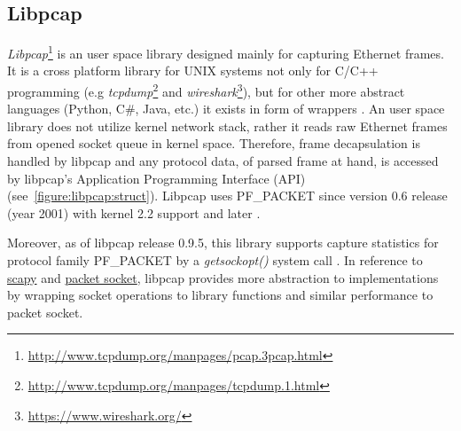 \documentclass[12pt,a4paper,twoside]{report}
\begin{document}
		\subsection{Libpcap} \label{analysis:mechs:libpcap}
			\emph{Libpcap}\footnote{\url{http://www.tcpdump.org/manpages/pcap.3pcap.html}} is an user space library designed mainly for capturing Ethernet frames. It is a cross platform library for UNIX systems not only for C/C++ programming (e.g \emph{tcpdump}\footnote{\url{http://www.tcpdump.org/manpages/tcpdump.1.html}} and \emph{wireshark}\footnote{\url{https://www.wireshark.org/}}), but for other more abstract languages (Python, C\#, Java, etc.) it exists in form of wrappers \cite{article:libpcap}. An user space library does not utilize kernel network stack, rather it reads raw Ethernet frames from opened socket queue in kernel space. Therefore, frame decapsulation is handled by libpcap and any protocol data, of parsed frame at hand, is accessed by libpcap's Application Programming Interface (API) (see~\autoref{figure:libpcap:struct}). Libpcap uses PF\_PACKET \cite{presentation:socket} \cite{report:libpcap} since version 0.6 release (year 2001) with kernel 2.2 support and later \cite{git:libpcap0.6:changes}.\par
			Moreover, as of libpcap release 0.9.5, this library supports capture statistics for protocol family PF\_PACKET by a \emph{getsockopt()} system call \cite{git:libpcap0.9:changes}. In reference to \hyperref[analysis:mechs:scapy_rss]{scapy} and \hyperref[analysis:mechs:socket]{packet socket}, libpcap provides more abstraction to implementations by wrapping socket operations to library functions and similar performance to packet socket.
\end{document}
